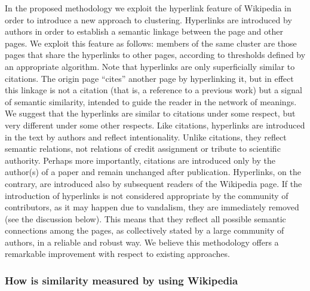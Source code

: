 \documentclass[]{book}
\begin{document}
In the proposed methodology we exploit the hyperlink feature of
Wikipedia in order to introduce a new approach to clustering. Hyperlinks
are introduced by authors in order to establish a semantic linkage
between the page and other pages. We exploit this feature as follows:
members of the same cluster are those pages that share the hyperlinks to
other pages, according to thresholds defined by an appropriate
algorithm. Note that hyperlinks are only superficially similar to
citations. The origin page ``cites'' another page by hyperlinking it,
but in effect this linkage is not a citation (that is, a reference to a
previous work) but a signal of semantic similarity, intended to guide
the reader in the network of meanings. We suggest that the hyperlinks
are similar to citations under some respect, but very different under
some other respects. Like citations, hyperlinks are introduced in the
text by authors and reflect intentionality. Unlike citations, they
reflect semantic relations, not relations of credit assignment or
tribute to scientific authority. Perhaps more importantly, citations are
introduced only by the author(s) of a paper and remain unchanged after
publication. Hyperlinks, on the contrary, are introduced also by
subsequent readers of the Wikipedia page. If the introduction of
hyperlinks is not considered appropriate by the community of
contributors, as it may happen due to vandalism, they are immediately
removed (see the discussion below). This means that they reflect all
possible semantic connections among the pages, as collectively stated by
a large community of authors, in a reliable and robust way. We believe
this methodology offers a remarkable improvement with respect to
existing approaches.

\subsubsection*{How is similarity measured by using
Wikipedia}\label{how-is-similarity-measured-by-using-wikipedia}
\end{document}
